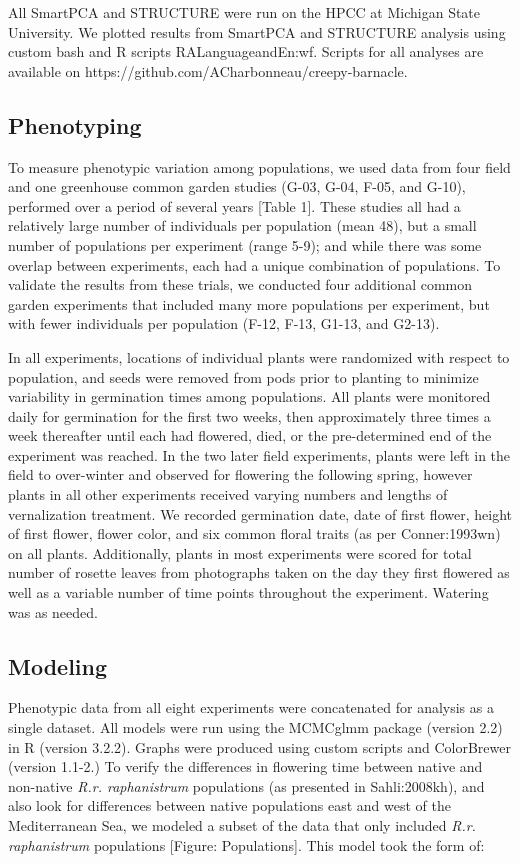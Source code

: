 \documentclass[twocolumn]{bmcart}%
\begin{document}
All SmartPCA and STRUCTURE were run on the HPCC at Michigan State University. We plotted results from SmartPCA and STRUCTURE analysis using custom bash and R scripts {RALanguageandEn:wf}. Scripts for all analyses are available on {https://github.com/ACharbonneau/creepy-barnacle}. 

\subsection*{Phenotyping}

To measure phenotypic variation among populations, we used data from four field and one greenhouse common garden studies (G-03, G-04, F-05, and G-10), performed over a period of several years [Table 1]. These studies all had a relatively large number of individuals per population (mean 48), but a small number of populations per experiment (range 5-9); and while there was some overlap between experiments, each had a unique combination of populations. To validate the results from these trials, we conducted four additional common garden experiments that included many more populations per experiment, but with fewer individuals per population (F-12, F-13, G1-13, and G2-13).

In all experiments, locations of individual plants were randomized with respect to population, and seeds were removed from pods prior to planting to minimize variability in germination times among populations. All plants were monitored daily for germination for the first two weeks, then approximately three times a week thereafter until each had flowered, died, or the pre-determined end of the experiment was reached. In the two later field experiments, plants were left in the field to over-winter and observed for flowering the following spring, however plants in all other experiments received varying numbers and lengths of vernalization treatment. We recorded germination date, date of first flower, height of first flower, flower color, and six common floral traits (as per {Conner:1993wn}) on all plants. Additionally, plants in most experiments were scored for total number of rosette leaves from photographs taken on the day they first flowered as well as a variable number of time points throughout the experiment. Watering was as needed.

\subsection*{Modeling}

Phenotypic data from all eight experiments were concatenated for analysis as a single dataset. All models were run using the MCMCglmm package (version 2.2) in R (version 3.2.2). Graphs were produced using custom scripts and ColorBrewer (version 1.1-2.) 
To verify the differences in flowering time between native and non-native \textit{R.r. raphanistrum} populations (as presented in {Sahli:2008kh}), and also look for differences between native populations east and west of the Mediterranean Sea, we modeled a subset of the data that only included \textit{R.r. raphanistrum} populations [Figure: Populations]. This model took the form of:
\end{document}
